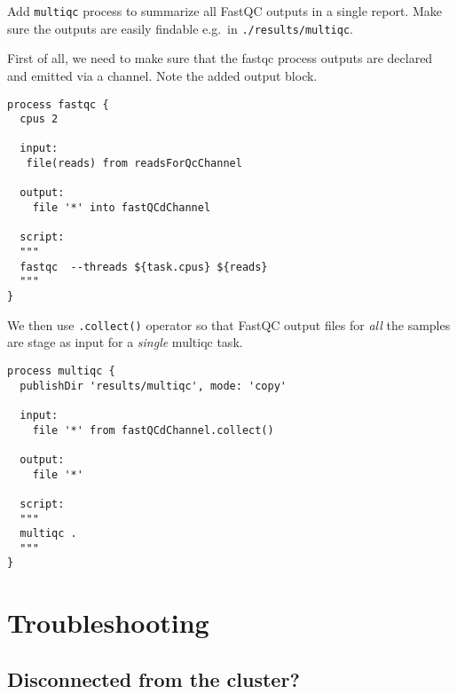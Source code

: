 \begin{bonus}
Add \texttt{multiqc} process to summarize all FastQC outputs in a single report.
Make sure the outputs are easily findable e.g.\ in \texttt{./results/multiqc}.
\begin{answer}
First of all, we need to make sure that the fastqc process outputs are declared and emitted via a channel. Note the added output block.

\begin{lstlisting}
process fastqc {
  cpus 2
    
  input:
   file(reads) from readsForQcChannel

  output:
    file '*' into fastQCdChannel

  script:
  """
  fastqc  --threads ${task.cpus} ${reads}
  """
}

\end{lstlisting}

We then use \texttt{.collect()} operator so that FastQC output files for \emph{all} the samples are stage as input for a \emph{single} multiqc task.

\begin{lstlisting}
process multiqc {
  publishDir 'results/multiqc', mode: 'copy'
  
  input: 
    file '*' from fastQCdChannel.collect()

  output:
    file '*'

  script:
  """
  multiqc .
  """
}
\end{lstlisting}
\end{answer}
\end{bonus}


%



\section{Troubleshooting}

\subsection{Disconnected from the cluster?}  

